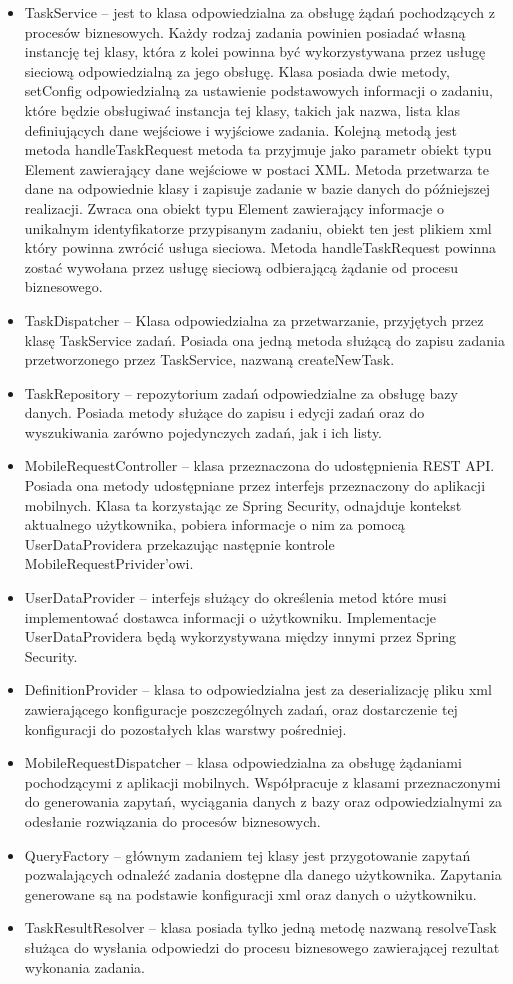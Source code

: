 \begin{itemize}
\item TaskService -- jest to klasa odpowiedzialna za obsługę żądań pochodzących z procesów biznesowych. Każdy rodzaj zadania powinien posiadać własną instancję tej klasy, która z kolei powinna być wykorzystywana przez usługę sieciową odpowiedzialną za jego obsługę. Klasa posiada dwie metody, setConfig odpowiedzialną za ustawienie podstawowych informacji o zadaniu, które będzie obsługiwać instancja tej klasy, takich jak nazwa, lista klas definiujących dane wejściowe i wyjściowe zadania. Kolejną metodą jest metoda handleTaskRequest metoda ta przyjmuje jako parametr obiekt typu Element zawierający dane wejściowe w postaci XML. Metoda przetwarza te dane na odpowiednie klasy i zapisuje zadanie w bazie danych do późniejszej realizacji. Zwraca ona obiekt typu Element zawierający informacje o unikalnym identyfikatorze przypisanym zadaniu, obiekt ten jest plikiem xml który powinna zwrócić usługa sieciowa. Metoda handleTaskRequest powinna zostać wywołana przez usługę sieciową odbierającą żądanie od procesu biznesowego.
\item TaskDispatcher -- Klasa odpowiedzialna za przetwarzanie, przyjętych przez klasę TaskService zadań. Posiada ona jedną metoda służącą do zapisu zadania przetworzonego przez  TaskService, nazwaną createNewTask.
\item TaskRepository -- repozytorium zadań odpowiedzialne za obsługę bazy danych. Posiada metody służące do zapisu i edycji zadań oraz do wyszukiwania zarówno pojedynczych zadań, jak i ich listy. 
\item MobileRequestController -- klasa przeznaczona do udostępnienia REST API. Posiada ona metody udostępniane przez interfejs przeznaczony do aplikacji mobilnych. Klasa ta korzystając ze Spring Security, odnajduje kontekst aktualnego użytkownika, pobiera informacje o nim za pomocą UserDataProvidera przekazując następnie kontrole MobileRequestPrivider'owi. 
\item UserDataProvider -- interfejs służący do określenia metod które musi implementować dostawca informacji o użytkowniku. Implementacje UserDataProvidera będą wykorzystywana między innymi przez Spring Security.
\item DefinitionProvider -- klasa to odpowiedzialna jest za deserializację pliku xml zawierającego konfiguracje poszczególnych zadań, oraz dostarczenie tej konfiguracji do pozostałych klas warstwy pośredniej. 
\item MobileRequestDispatcher -- klasa odpowiedzialna za obsługę żądaniami pochodzącymi z aplikacji mobilnych. Współpracuje z klasami przeznaczonymi do generowania zapytań, wyciągania danych z bazy oraz odpowiedzialnymi za odesłanie rozwiązania do procesów biznesowych. 
\item QueryFactory -- głównym zadaniem tej klasy jest przygotowanie zapytań pozwalających odnaleźć zadania dostępne dla danego użytkownika. Zapytania generowane są na podstawie konfiguracji xml oraz danych o użytkowniku. 
\item TaskResultResolver -- klasa posiada tylko jedną metodę nazwaną resolveTask służąca do wysłania odpowiedzi do procesu biznesowego zawierającej rezultat wykonania zadania. 
\end{itemize}

